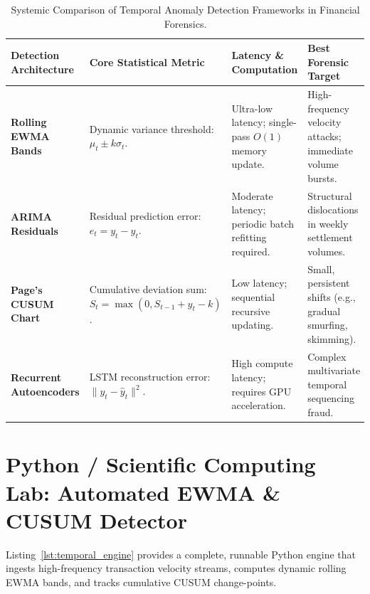 \begin{table}[htbp]
\centering
\small
\begin{tabularx}{\textwidth}{lXXX}
\toprule
\textbf{Detection Architecture} & \textbf{Core Statistical Metric} & \textbf{Latency \& Computation} & \textbf{Best Forensic Target} \\
\midrule
\textbf{Rolling EWMA Bands} & Dynamic variance threshold: $\mu_t \pm k \sigma_t$. & Ultra-low latency; single-pass $O(1)$ memory update. & High-frequency velocity attacks; immediate volume bursts. \\
\addlinespace
\textbf{ARIMA Residuals} & Residual prediction error: $e_t = y_t - \hat{y}_t$. & Moderate latency; periodic batch refitting required. & Structural dislocations in weekly settlement volumes. \\
\addlinespace
\textbf{Page's CUSUM Chart} & Cumulative deviation sum: $S_t = \max(0, S_{t-1} + y_t - k)$. & Low latency; sequential recursive updating. & Small, persistent shifts (e.g., gradual smurfing, skimming). \\
\addlinespace
\textbf{Recurrent Autoencoders} & LSTM reconstruction error: $\|y_t - \hat{y}_t\|^2$. & High compute latency; requires GPU acceleration. & Complex multivariate temporal sequencing fraud. \\
\bottomrule
\end{tabularx}
\caption{Systemic Comparison of Temporal Anomaly Detection Frameworks in Financial Forensics.}
\label{tab:comparison_temporal_detectors}
\end{table}

\section{Python / Scientific Computing Lab: Automated EWMA \& CUSUM Detector}

Listing~\ref{lst:temporal_engine} provides a complete, runnable Python engine that ingests high-frequency transaction velocity streams, computes dynamic rolling EWMA bands, and tracks cumulative CUSUM change-points.


